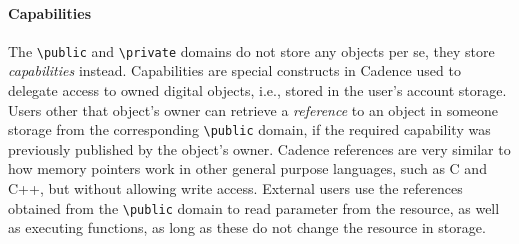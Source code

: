 \documentclass[../main.tex]{subfiles}
\begin{document}
\paragraph{Capabilities}
\label{sec:capabilities}
The \verb|\public| and \verb|\private| domains do not store any objects per se, they store \textit{capabilities} instead. Capabilities are special constructs in Cadence used to delegate access to owned digital objects, i.e., stored in the user's account storage. Users other that object's owner can retrieve a \textit{reference} to an object in someone storage from the corresponding \verb|\public| domain, if the required capability was previously published by the object's owner. Cadence references are very similar to how memory pointers work in other general purpose languages, such as C and C++, but without allowing write access. External users use the references obtained from the \verb|\public| domain to read parameter from the resource, as well as executing functions, as long as these do not change the resource in storage.
\end{document}
